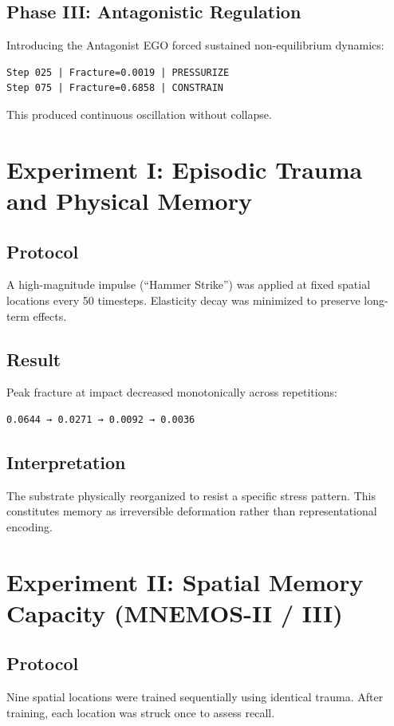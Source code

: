\documentclass[11pt, a4paper]{article}
\begin{document}
\subsection{Phase III: Antagonistic Regulation}
Introducing the Antagonist EGO forced sustained non-equilibrium dynamics:
\begin{lstlisting}
Step 025 | Fracture=0.0019 | PRESSURIZE
Step 075 | Fracture=0.6858 | CONSTRAIN
\end{lstlisting}

This produced continuous oscillation without collapse.

\section{Experiment I: Episodic Trauma and Physical Memory}

\subsection{Protocol}
A high-magnitude impulse (“Hammer Strike”) was applied at fixed spatial locations every 50 timesteps. Elasticity decay was minimized to preserve long-term effects.

\subsection{Result}
Peak fracture at impact decreased monotonically across repetitions:
\begin{lstlisting}
0.0644 → 0.0271 → 0.0092 → 0.0036
\end{lstlisting}

\subsection{Interpretation}
The substrate physically reorganized to resist a specific stress pattern. This constitutes memory as irreversible deformation rather than representational encoding.

\section{Experiment II: Spatial Memory Capacity (MNEMOS-II / III)}

\subsection{Protocol}
Nine spatial locations were trained sequentially using identical trauma. After training, each location was struck once to assess recall.
\end{document}
